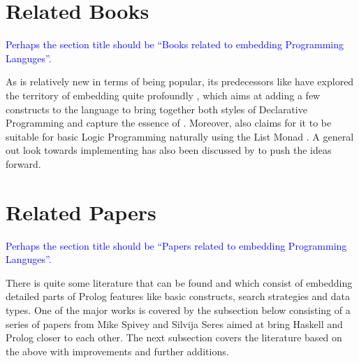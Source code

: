 \documentclass[thesis-solanki.tex]{subfiles}
\begin{document}
\section{Related Books}
\textcolor{blue}{Perhaps the section title should be ``Books related to embedding Programming Languges''.}

As  is relatively new in terms of being popular, its predecessors like  have
explored the territory of embedding  quite profoundly \cite{friedman05reasoned}, which aims at adding a few
constructs to the language to bring together both styles of Declarative Programming and capture the essence of
.
Moreover,  also claims for it to be suitable for basic Logic Programming naturally using the List
Monad \cite{website:logicprogexamplehaskell}.
A general out look towards implementing  has also been discussed by
\cite{krishnamurthi2007programming} to push the ideas forward.

\begin{comment}
All the more \textit{Prologish} things exist in Haskell, as mentioned alone it is not the only one if we consider it in the ''Scheme'' \cite{friedman05reasoned} of things and so is replication to other languages \cite{krishnamurthi2007programming}.
\end{comment}

\begin{comment}
\begin{enumerate}
\item The Reasoned Schemer, Daniel P. Friedman, William E. Byrd, Oleg Kiselyov

\item Programming Languages: Application and Interpretation, Shriram Krishnamurthi,
\\*  Chapters 33-34 of PLAI discuss Prolog and implementing Prolog

\end{enumerate}
\end{comment}

\section{Related Papers}
\textcolor{blue}{Perhaps the section title should be ``Papers related to embedding Programming Languges''.}

There is quite some literature
that can be found and which consist of embedding detailed parts of Prolog features
like basic constructs, search strategies and data types.
One of the major works is covered by the subsection below consisting of a series of papers from Mike Spivey and
Silvija Seres aimed at bring Haskell and Prolog closer to each other.
The next subsection covers the literature based on the above with improvements and further additions.
\end{document}
